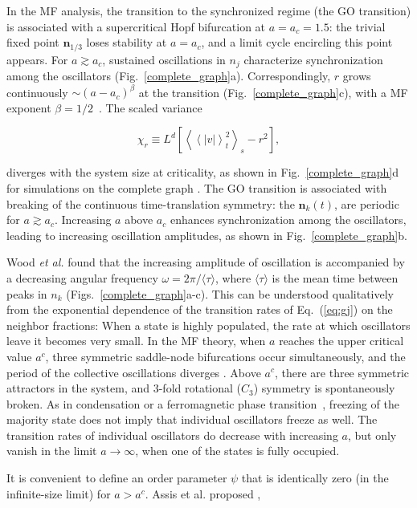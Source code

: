In the MF analysis, the transition to the synchronized regime (the GO transition) is associated with a supercritical Hopf bifurcation
at $a=a_c=1.5$: the trivial fixed point $\textbf{n}_{1/3}$ loses stability at $a=a_c$, and a limit cycle encircling this point appears.
For $a \gtrsim a_c$, sustained oscillations in $n_j$ characterize synchronization among the oscillators (Fig.~\ref{complete_graph}a).
Correspondingly, $r$ grows continuously $\sim (a-a_c)^\beta$ at the transition (Fig.~\ref{complete_graph}c), with a MF exponent $\beta
= 1/2$~\cite{Wood06a}. The scaled variance

\begin{equation}
    \chi_r \equiv L^d \left[ \left< \left< |v| \right>^2_t \right>_s - r^2 \right],
    \label{eq:chir}
\end{equation}

\noindent diverges with the system size at criticality, as shown in Fig.~\ref{complete_graph}d for simulations on the complete graph
\cite{assis2011infinite}. The GO transition is associated with breaking of the continuous time-translation symmetry: the
$\textbf{n}_k(t)$, are periodic for $a\gtrsim a_c$.  Increasing $a$ above $a_c$ enhances synchronization among the oscillators, leading
to increasing oscillation amplitudes, as shown in Fig.~\ref{complete_graph}b.

Wood \textit{et al.} found that the increasing amplitude of oscillation is accompanied by a decreasing angular frequency $\omega =
2\pi/\langle \tau \rangle$, where $\langle \tau \rangle$ is the mean time between peaks in $n_k$ (Figs.~\ref{complete_graph}a-c). This
can be understood qualitatively from the exponential dependence of the transition rates of Eq.~(\ref{eq:gj}) on the neighbor fractions:
When a state is highly populated, the rate at which oscillators leave it becomes very small.  In the MF theory, when $a$ reaches the
upper critical value $a^c$, three symmetric saddle-node bifurcations occur simultaneously, and the period of the collective
oscillations diverges \cite{assis2011infinite}. Above $a^c$, there are three symmetric attractors in the system, and 3-fold rotational
($C_3$) symmetry is spontaneously broken.  As in condensation or a ferromagnetic phase transition~\cite{Huang}, freezing of the
majority state does not imply that individual oscillators freeze as well.  The transition rates of individual oscillators do decrease
with increasing $a$, but only vanish in the limit $a\to\infty$, when one of the states is fully occupied.

It is convenient to define an order parameter $\psi$ that is identically zero (in the infinite-size limit) for $a>a^c$. Assis et al.
proposed \cite{assis2011infinite},
\vspace{1em}

